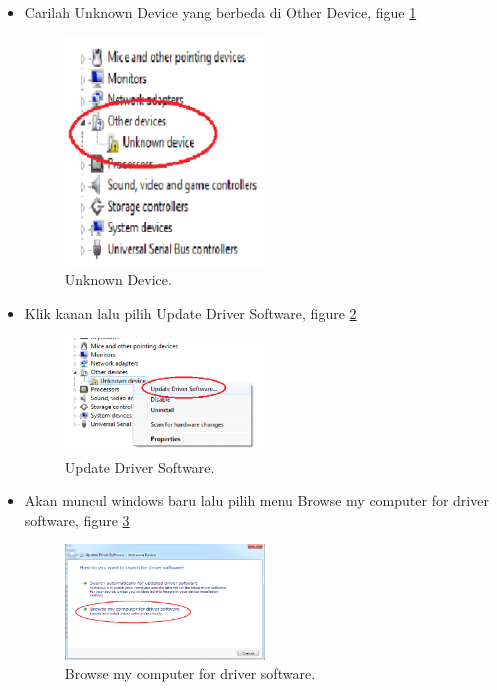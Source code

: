 \begin{enumerate}
\begin{itemize}
	\item Carilah Unknown Device yang berbeda di Other Device, figue \ref{YNC5-3}

	\begin{figure}[!htbp]
		\centerline{\includegraphics[width=0.5\textwidth]{figures/chapter5/1164089/YNC5-3.png}}
		\caption{Unknown Device.}
		\label{YNC5-3}
	\end{figure}	

	\item Klik kanan lalu pilih Update Driver Software, figure \ref{YNC5-4}

	\begin{figure}[!htbp]
		\centerline{\includegraphics[width=0.5\textwidth]{figures/chapter5/1164089/YNC5-4.png}}
		\caption{Update Driver Software.}
		\label{YNC5-4}
	\end{figure}	

	\item Akan muncul windows baru lalu pilih  menu Browse my computer for driver software, figure \ref{YNC5-5}

	\begin{figure}[!htbp]
		\centerline{\includegraphics[width=0.5\textwidth]{figures/chapter5/1164089/YNC5-5.png}}
		\caption{Browse my computer for driver software.}
		\label{YNC5-5}
	\end{figure}	


\end{itemize}
\end{enumerate}
